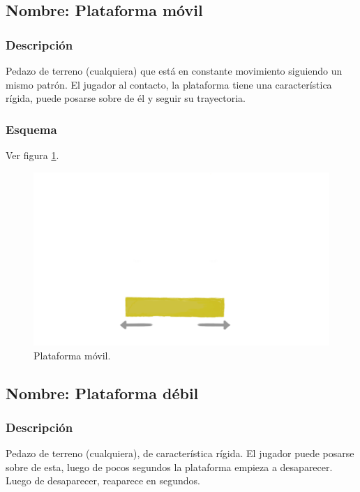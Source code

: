 \documentclass[11pt,letterpaper]{article}
\begin{document}
	\subsection{Nombre: Plataforma móvil}\label{obs.plataformaM}
	\subsubsection{Descripción}
	Pedazo de terreno (cualquiera) que está en constante movimiento siguiendo un mismo patrón. El jugador al contacto, la plataforma tiene una característica rígida, puede posarse sobre de él y seguir su trayectoria.
	\subsubsection{Esquema}
	Ver figura \ref{fig:plataformaM}.
	\begin{figure}
		\centering
		\includegraphics[height=0.2 \textheight]{Imagenes/plataformaM}
		\caption{Plataforma móvil.}
		\label{fig:plataformaM}
	\end{figure}
		\subsection{Nombre: Plataforma débil}\label{obs.plataformaD}
	\subsubsection{Descripción}
	Pedazo de terreno (cualquiera), de característica rígida. El jugador puede posarse sobre de esta, luego de pocos segundos la plataforma empieza a desaparecer. Luego de desaparecer, reaparece en segundos.
\end{document}

